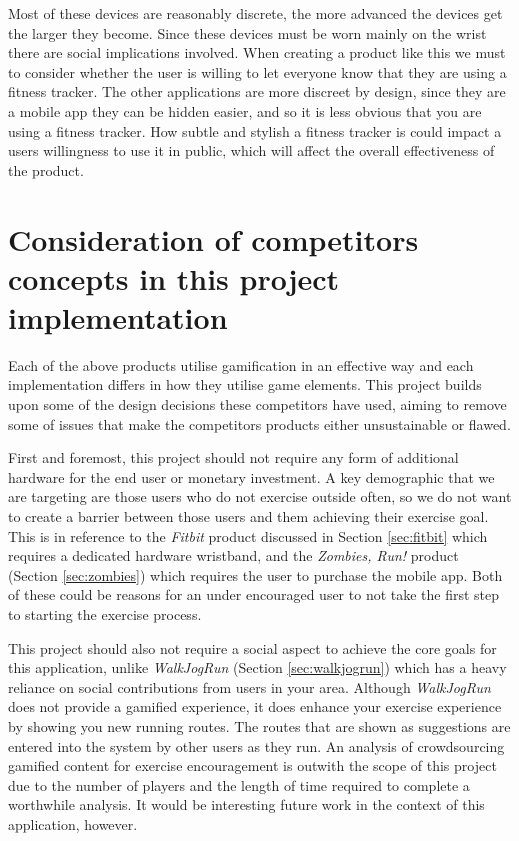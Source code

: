 Most of these devices are reasonably discrete, the more advanced the
devices get the larger they become. Since these devices must be worn
mainly on the wrist there are social implications involved. When
creating a product like this we must to consider whether the user
is willing to let everyone know that they are using a fitness tracker.
The other applications are more discreet by design, since they are a
mobile app they can be hidden easier, and so it is less obvious that
you are using a fitness tracker. How subtle and stylish a fitness
tracker is could impact a users willingness to use it in public, which
will affect the overall effectiveness of the product.

\section{Consideration of competitors concepts in this project
  implementation}
\label{sec:consideration}
Each of the above products utilise gamification in an effective way
and each implementation differs in how they utilise game
elements. This project builds upon some of the design decisions these
competitors have used, aiming to remove some of issues that make the
competitors products either unsustainable or flawed.

First and foremost, this project should not require any form of
additional hardware for the end user or monetary investment. A key
demographic that we are targeting are those users who do not exercise
outside often, so we do not want to create a barrier between those
users and them achieving their exercise goal. This is in reference to
the \emph{Fitbit} product discussed in Section \ref{sec:fitbit} which
requires a dedicated hardware wristband, and the \emph{Zombies, Run!} product
(Section \ref{sec:zombies}) which requires the user to purchase the
mobile app. Both of these could be reasons for an under encouraged
user to not take the first step to starting the exercise process.

This project should also not require a social aspect to achieve the
core goals for this application, unlike \emph{WalkJogRun} (Section
\ref{sec:walkjogrun}) which has a heavy reliance on social
contributions from users in your area. Although \emph{WalkJogRun} does not
provide a gamified experience, it does enhance your exercise
experience by showing you new running routes. The routes that are
shown as suggestions are entered into the system by other users as
they run. An analysis of crowdsourcing gamified content for exercise
encouragement is outwith the scope of this project due to the number
of players and the length of time required to complete a worthwhile
analysis. It would be interesting future work in the context of this
application, however. 

